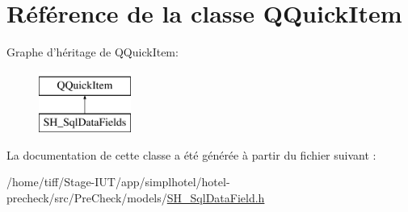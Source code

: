 \hypertarget{classQQuickItem}{\section{Référence de la classe Q\-Quick\-Item}
\label{classQQuickItem}
}
Graphe d'héritage de Q\-Quick\-Item\-:\begin{figure}[H]
\begin{center}
\leavevmode
\includegraphics[height=2.000000cm]{classQQuickItem}
\end{center}
\end{figure}


La documentation de cette classe a été générée à partir du fichier suivant \-:\begin{DoxyCompactItemize}
\item 
/home/tiff/\-Stage-\/\-I\-U\-T/app/simplhotel/hotel-\/precheck/src/\-Pre\-Check/models/\hyperlink{SH__SqlDataField_8h}{S\-H\-\_\-\-Sql\-Data\-Field.\-h}\end{DoxyCompactItemize}
